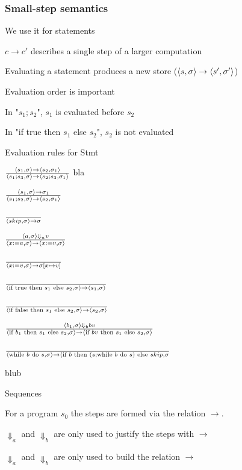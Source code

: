 \subsubsection{Small-step semantics}
\enumstart
	\item We use it for statements
	\item $c \rightarrow c'$ describes a single step of a larger computation
	\item Evaluating a statement produces a new store ($\langle s, \sigma \rangle \rightarrow \langle s', \sigma' \rangle$)
	\item Evaluation order is important
	\enumstart
		\item In "$s_1;s_2$", $s_1$ is evaluated before $s_2$
		\item In "if true then $s_1$ else $s_2$", $s_2$ is not evaluated
	\enumend
	\item Evaluation rules for Stmt
	\enumstart
		\item $\frac{\langle s_1, \sigma \rangle \rightarrow \langle s_2, \sigma_1 \rangle}{\langle s_1;s_3, \sigma \rangle \rightarrow \langle s_2;s_3, \sigma_1 \rangle}$ bla
		\item $\frac{\langle s_1, \sigma \rangle \rightarrow \sigma_1}{\langle s_1;s_2, \sigma \rangle \rightarrow \langle s_2, \sigma_1 \rangle}$
		\item $\frac{}{\langle skip, \sigma \rangle \rightarrow \sigma}$
		\item $\frac{\langle a, \sigma \rangle \Downarrow_a v}{\langle x := a, \sigma \rangle \rightarrow \langle x := v, \sigma \rangle}$
		\item $\frac{}{\langle x := v, \sigma \rangle \rightarrow \sigma[x \mapsto v]}$
		\item $\frac{}{\langle \text{if true then } s_1 \text{ else } s_2, \sigma \rangle \rightarrow \langle s_1, \sigma \rangle}$
		\item $\frac{}{\langle \text{if false then } s_1 \text{ else } s_2, \sigma \rangle \rightarrow \langle s_2, \sigma \rangle}$
		\item $\frac{\langle b_1, \sigma \rangle \Downarrow_b bv}{\langle \text{if } b_1 \text{ then } s_1 \text{ else } s_2, \sigma \rangle \rightarrow \langle \text{if } bv \text{ then } s_1 \text{ else } s_2, \sigma \rangle}$
		\item $\frac{}{\langle \text{while } b \text{ do } s, \sigma \rangle \rightarrow \langle \text{if } b \text{ then } (s; \text{while } b \text{ do } s) \text{ else } skip, \sigma}$
		\item blub
	\enumend
	\item Sequences
	\enumstart
		\item For a program $s_0$ the steps are formed via the relation $\rightarrow$.
		\item $\Downarrow_a$ and $\Downarrow_b$ are only used to justify the steps with $\rightarrow$
		\item $\Downarrow_a$ and $\Downarrow_b$ are only used to build the relation $\rightarrow$
	\enumend
\enumend

